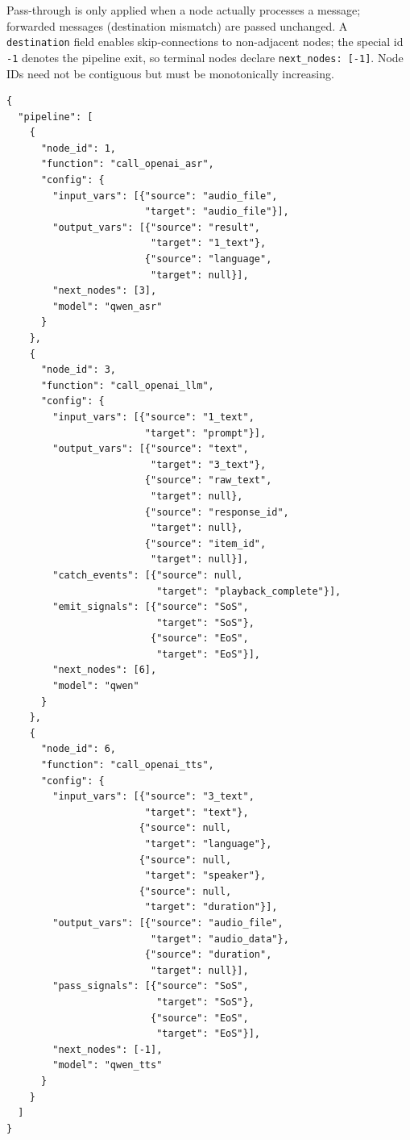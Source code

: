 \documentclass[11pt,a4paper]{article}
\begin{document}
Pass-through is only applied when a node actually processes a message; forwarded messages (destination mismatch) are passed unchanged. A \texttt{destination} field enables skip-connections to non-adjacent nodes; the special id \texttt{-1} denotes the pipeline exit, so terminal nodes declare \texttt{next\_nodes: [-1]}. Node IDs need not be contiguous but must be monotonically increasing.

\begin{lstlisting}[caption={Pipeline configuration (valid as written).}]
{
  "pipeline": [
    {
      "node_id": 1,
      "function": "call_openai_asr",
      "config": {
        "input_vars": [{"source": "audio_file",
                        "target": "audio_file"}],
        "output_vars": [{"source": "result",
                         "target": "1_text"},
                        {"source": "language",
                         "target": null}],
        "next_nodes": [3],
        "model": "qwen_asr"
      }
    },
    {
      "node_id": 3,
      "function": "call_openai_llm",
      "config": {
        "input_vars": [{"source": "1_text",
                        "target": "prompt"}],
        "output_vars": [{"source": "text",
                         "target": "3_text"},
                        {"source": "raw_text",
                         "target": null},
                        {"source": "response_id",
                         "target": null},
                        {"source": "item_id",
                         "target": null}],
        "catch_events": [{"source": null,
                          "target": "playback_complete"}],
        "emit_signals": [{"source": "SoS",
                          "target": "SoS"},
                         {"source": "EoS",
                          "target": "EoS"}],
        "next_nodes": [6],
        "model": "qwen"
      }
    },
    {
      "node_id": 6,
      "function": "call_openai_tts",
      "config": {
        "input_vars": [{"source": "3_text",
                        "target": "text"},
                       {"source": null,
                        "target": "language"},
                       {"source": null,
                        "target": "speaker"},
                       {"source": null,
                        "target": "duration"}],
        "output_vars": [{"source": "audio_file",
                         "target": "audio_data"},
                        {"source": "duration",
                         "target": null}],
        "pass_signals": [{"source": "SoS",
                          "target": "SoS"},
                         {"source": "EoS",
                          "target": "EoS"}],
        "next_nodes": [-1],
        "model": "qwen_tts"
      }
    }
  ]
}
\end{lstlisting}
\end{document}
